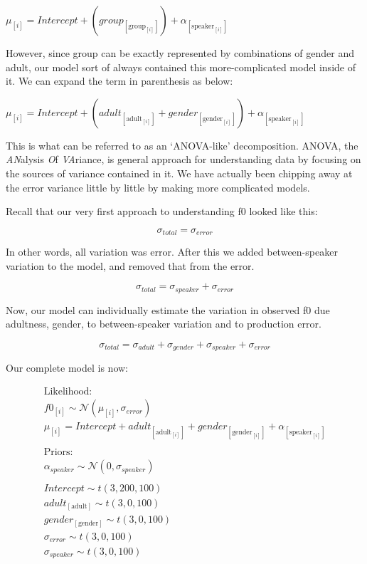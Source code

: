\documentclass[
]{book}
\begin{document}
\(\mu_{[i]} = Intercept + (group_{[\mathrm{group}_{[i]}]}) + \alpha_{[\mathrm{speaker}_{[i]}]}\)

However, since group can be exactly represented by combinations of gender and adult, our model sort of always contained this more-complicated model inside of it. We can expand the term in parenthesis as below:

\(\mu_{[i]} = Intercept + (adult_{[\mathrm{adult}_{[i]}]} + gender_{[\mathrm{gender}_{[i]}]}) + \alpha_{[\mathrm{speaker}_{[i]}]}\)

This is what can be referred to as an `ANOVA-like' decomposition. ANOVA, the \emph{AN}alysis \emph{O}f \emph{VA}riance, is general approach for understanding data by focusing on the sources of variance contained in it. We have actually been chipping away at the error variance little by little by making more complicated models.

Recall that our very first approach to understanding f0 looked like this:

\[
\sigma_{total} = \sigma_{error}
\]

In other words, all variation was error. After this we added between-speaker variation to the model, and removed that from the error.

\[
\sigma_{total} = \sigma_{speaker} + \sigma_{error}
\]

Now, our model can individually estimate the variation in observed f0 due adultness, gender, to between-speaker variation and to production error.

\[
\sigma_{total} = \sigma_{adult} + \sigma_{gender}+\sigma_{speaker} + \sigma_{error}
\]

Our complete model is now:

\begin{equation}
\begin{split}
\textrm{Likelihood:} \\
f0_{[i]} \sim \mathcal{N}(\mu_{[i]},\sigma_{error}) \\
\mu_{[i]} = Intercept + adult_{[\mathrm{adult}_{[i]}]}+gender_{[\mathrm{gender}_{[i]}]} + \alpha_{[\mathrm{speaker}_{[i]}]} \\\\
\textrm{Priors:} \\
\alpha_{speaker} \sim \mathcal{N}(0,\sigma_{speaker}) \\ \\ 
Intercept \sim t(3, 200, 100) \\ 
adult_{[\mathrm{adult}]} \sim t(3, 0, 100) \\ 
gender_{[\mathrm{gender}]} \sim t(3, 0, 100) \\ 
\sigma_{error} \sim t(3, 0, 100) \\
\sigma_{speaker} \sim t(3, 0, 100) \\ 
\end{split}
\label{eq:42}
\end{equation}
\end{document}
